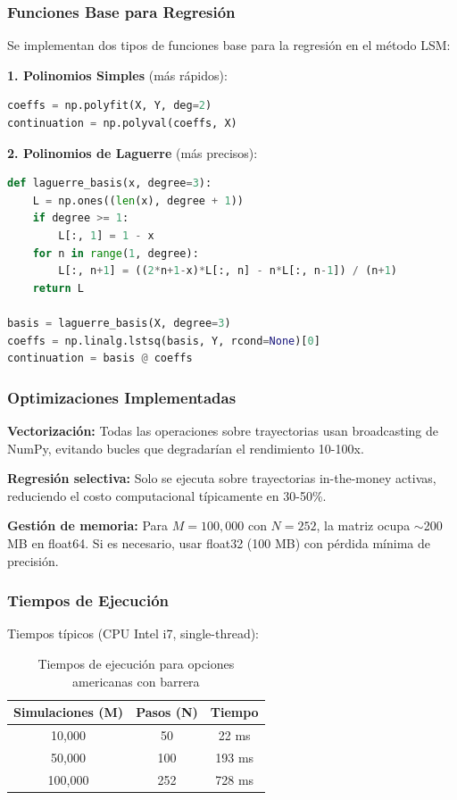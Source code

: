 \subsubsection{Funciones Base para Regresión}

Se implementan dos tipos de funciones base para la regresión en el método LSM:

\textbf{1. Polinomios Simples} (más rápidos):
\begin{lstlisting}[language=Python]
coeffs = np.polyfit(X, Y, deg=2)
continuation = np.polyval(coeffs, X)
\end{lstlisting}

\textbf{2. Polinomios de Laguerre} (más precisos):
\begin{lstlisting}[language=Python]
def laguerre_basis(x, degree=3):
    L = np.ones((len(x), degree + 1))
    if degree >= 1:
        L[:, 1] = 1 - x
    for n in range(1, degree):
        L[:, n+1] = ((2*n+1-x)*L[:, n] - n*L[:, n-1]) / (n+1)
    return L

basis = laguerre_basis(X, degree=3)
coeffs = np.linalg.lstsq(basis, Y, rcond=None)[0]
continuation = basis @ coeffs
\end{lstlisting}

\subsubsection{Optimizaciones Implementadas}

\textbf{Vectorización:} Todas las operaciones sobre trayectorias usan broadcasting de NumPy, evitando bucles que degradarían el rendimiento 10-100x.

\textbf{Regresión selectiva:} Solo se ejecuta sobre trayectorias in-the-money activas, reduciendo el costo computacional típicamente en 30-50\%.

\textbf{Gestión de memoria:} Para $M=100,000$ con $N=252$, la matriz ocupa $\sim$200 MB en float64. Si es necesario, usar float32 (100 MB) con pérdida mínima de precisión.

\subsubsection{Tiempos de Ejecución}

Tiempos típicos (CPU Intel i7, single-thread):

\begin{table}[H]
\centering
\small
\caption{Tiempos de ejecución para opciones americanas con barrera}
\begin{tabular}{ccc}
\toprule
\textbf{Simulaciones (M)} & \textbf{Pasos (N)} & \textbf{Tiempo} \\
\midrule
10,000 & 50 & 22 ms \\
50,000 & 100 & 193 ms \\
100,000 & 252 & 728 ms \\
\bottomrule
\end{tabular}
\end{table}

